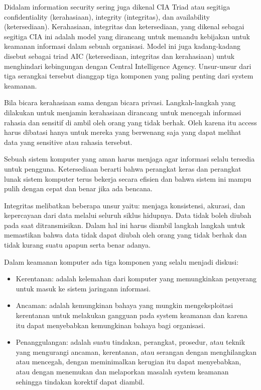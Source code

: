 \documentclass[conference]{IEEEtran}
\begin{document}
Didalam information security sering juga dikenal CIA Triad atau segitiga confidentiality (kerahasiaan), integrity (integritas), dan availability (ketersediaan). Kerahasiaan, integritas dan ketersediaan, yang dikenal sebagai segitiga CIA ini adalah model yang dirancang untuk memandu kebijakan untuk keamanan informasi dalam sebuah organisasi. Model ini juga kadang-kadang disebut sebagai triad AIC (ketersediaan, integritas dan kerahasiaan) untuk menghindari kebingungan dengan Central Intelligence Agency. Unsur-unsur dari tiga serangkai tersebut dianggap tiga komponen yang paling penting dari system keamanan.

Bila bicara kerahasiaan sama dengan bicara privasi. Langkah-langkah yang dilakukan untuk menjamin kerahasiaan dirancang untuk mencegah informasi rahasia dan sensitif di ambil oleh orang yang tidak berhak. Oleh karena itu access harus dibatasi hanya untuk mereka yang berwenang saja yang dapat melihat data yang sensitive atau rahasia tersebut.

Sebuah sistem komputer yang aman harus menjaga agar informasi selalu tersedia untuk pengguna. Ketersediaan berarti bahwa perangkat keras dan perangkat lunak sistem komputer terus bekerja secara efisien dan bahwa sistem ini mampu pulih dengan cepat dan benar jika ada bencana.

Integritas melibatkan beberapa unsur yaitu: menjaga konsistensi, akurasi, dan kepercayaan dari data melalui seluruh siklus hidupnya. Data tidak boleh diubah pada saat ditransmisikan. Dalam hal ini harus diambil langkah langkah untuk memastikan bahwa data tidak dapat diubah oleh orang yang tidak berhak dan tidak kurang suatu apapun serta benar adanya.

Dalam keamanan komputer ada tiga komponen yang selalu menjadi diskusi:
\begin{itemize}
    \item Kerentanan: adalah kelemahan dari komputer yang memungkinkan penyerang untuk masuk ke sistem jaringann informasi.
    \item Ancaman: adalah kemungkinan bahaya yang mungkin mengeksploitasi kerentanan untuk melakukan gangguan pada system keamanan dan karena itu dapat menyebabkan kemungkinan bahaya bagi organisasi.
    \item Penanggulangan: adalah suatu tindakan, perangkat, prosedur, atau teknik yang mengurangi ancaman, kerentanan, atau serangan dengan menghilangkan atau mencegah, dengan meminimalkan kerugian itu dapat menyebabkan, atau dengan menemukan dan melaporkan masalah system keamanan sehingga tindakan korektif dapat diambil.
\end{itemize}
\end{document}
